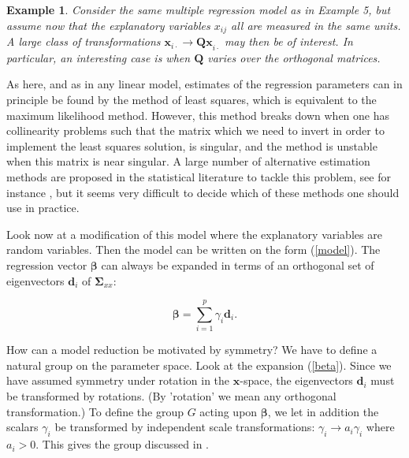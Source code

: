 \documentclass[a4paper, 11pt]{article}
\newtheorem{example}{Example}
\begin{document}
\smallskip

\begin{example}
  Consider the same multiple regression model as in Example 5, but assume now that the explanatory variables $x_{ij}$ all are measured in the same units. A large class of transformations $\bm{x}_{i\cdot}\rightarrow \bm{Qx}_{i\cdot}$ may then be of interest. In particular, an interesting case is when $\bm{Q}$ varies over the orthogonal matrices.
\end{example}

\smallskip

As here, and as in any linear model, estimates of the regression parameters can in principle be found by the method of least squares, which is equivalent to 
the maximum likelihood method. However, this method breaks down when one has collinearity problems such that the matrix which we need to invert in order to implement the least squares solution, is singular, and the method is unstable when this matrix is near singular. A large number of alternative estimation methods are proposed in the statistical literature to tackle this problem, see for instance \citet{hastie2009elements}, but it seems very difficult to decide which of these methods one should use in practice.

Look now at a modification of this model where the explanatory variables are random variables. Then the model can be written on the form (\ref{model}).  The regression vector $\bm{\beta}$ can always be expanded in terms of an orthogonal set of eigenvectors $\bm{d}_i$ of $\bm{\Sigma}_{xx}$:

\begin{equation}
  \bm{\beta}=\sum_{i=1}^p \gamma_i \bm{d}_i .
  \label{beta}
\end{equation}

How can a model reduction be motivated by symmetry? We have to define a natural group on the parameter space. Look at the expansion (\ref{beta}). Since we have assumed symmetry under rotation in the $\bm{x}$-space, the eigenvectors $\bm{d}_i$ must be transformed by rotations. (By 'rotation' we mean any orthogonal transformation.) To define the group $G$ acting upon $\bm{\beta}$, we let in addition the scalars $\gamma_i$ be transformed by independent scale transformations: $\gamma_i \rightarrow a_i \gamma_i$ where $a_i >0$. This gives the group discussed in \citet{helland2012near}.
\end{document}
